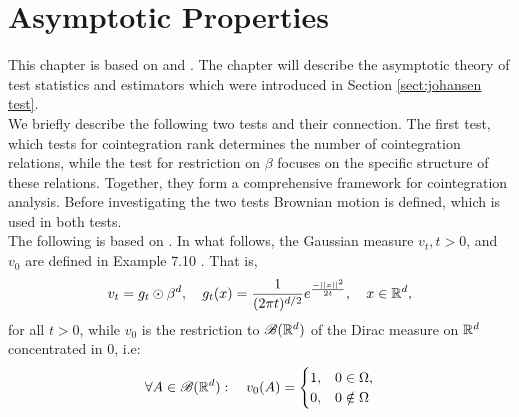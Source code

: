\section{Asymptotic Properties}
This chapter is based on \cite{Statistica_analysis_of_cointegrating_vectors} and \cite{Modelling_of_cointegration_in_the_vector_autoregressive_model}. The chapter will describe the asymptotic theory of test statistics and estimators which were introduced in Section \ref{sect:johansen test}.\\

\noindent We briefly describe the following two tests and their connection. The first test, which tests for cointegration rank determines the number of cointegration relations, while the test for restriction on $\beta$ focuses on the specific structure of these relations. Together, they form a comprehensive framework for cointegration analysis. Before investigating the two tests Brownian motion is defined, which is used in both tests.\\

\noindent 
The following is based on \cite{Measure_theory_integration_theory_and_stochastic_processes}. In what follows, the Gaussian measure $v_t, t>0$, and $v_0$ are defined in Example 7.10 \cite{Measure_theory_integration_theory_and_stochastic_processes}. That is,
\begin{equation*}
    v_t=g_t \odot \beta^d, \quad g_t(x)=\frac{1}{(2\pi t)^{d/2}}e^{\frac{-||x||^2}{2t}}, \quad x\in \mathbb{R}^d,
\end{equation*}
for all $t>0$, while $v_0$ is the restriction to $\mathscr{B}(\mathbb{R}^d)$ of the Dirac measure on $\mathbb{R}^d$ concentrated in 0, i.e:
\begin{equation*}
    \forall A \in \mathscr{B}(\mathbb{R}^d): \quad v_0(A)=\begin{cases} 
1,& 0 \in \Omega, \\
0,& 0 \notin \Omega
\end{cases}
\end{equation*}

